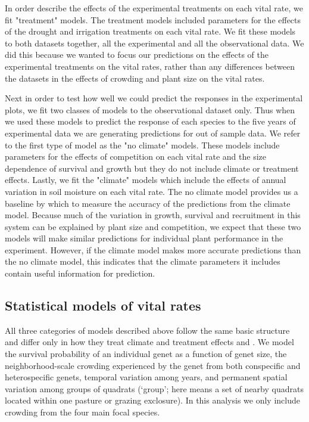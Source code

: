 \documentclass[11pt]{article}
\begin{document}
\begin{doublespacing}
In order describe the effects of the experimental treatments on each vital rate, we fit "treatment" models. The treatment models included parameters for the effects of the drought and irrigation treatments on each vital rate. We fit these models to both datasets together, all the experimental and all the observational data. We did this because we wanted to focus our predictions on the effects of the experimental treatments on the vital rates, rather than any differences between the datasets in the effects of crowding and plant size on the vital rates. 

Next in order to test how well we could predict the responses in the experimental plots, we fit two classes of models to the observational dataset only. Thus when we used these models to predict the response of each species to the five years of experimental data we are generating predictions for out of sample data. We refer to the first type of model as the "no climate" models. These models include parameters for the effects of competition on each vital rate and the size dependence of survival and growth but they do not include climate or treatment effects. Lastly, we fit the "climate" models which include the effects of annual variation in soil moisture on each vital rate.  The no climate model provides us a baseline by which to measure the accuracy of the predictions from the climate model. Because much of the variation in growth, survival and recruitment in this system can be explained by plant size and competition, we expect that these two models will make similar predictions for individual plant performance in the experiment.  However, if the climate model makes more accurate predictions than the no climate model, this indicates that the climate parameters it includes contain useful information for prediction.
 
\subsection*{Statistical models of vital rates}

All three categories of models described above follow the same basic structure and differ only in how they treat climate and treatment effects and  \citep{adler_coexistence_2010,chu_large_2015}. We model the survival probability of an individual genet as a function of genet size, the neighborhood-scale crowding experienced by the genet from both conspecific and heterospecific genets, temporal variation among years, and permanent spatial variation among groups of quadrats (`group'; here means a set of nearby quadrats located within one pasture or grazing exclosure). In this analysis we only include crowding from the four main focal species. 


\end{doublespacing}
\end{document}
